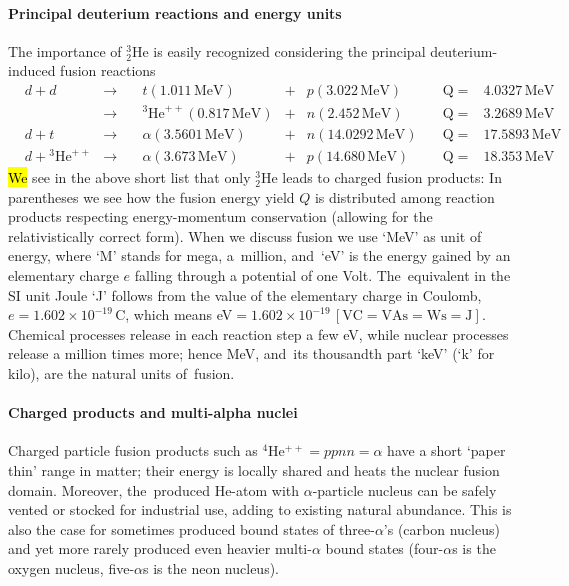 \documentclass[particles,article,accept,pdftex,moreauthors]{Definitions/mdpi}
\begin{document}
\vspace{-6pt}\paragraph*{\bf Principal deuterium reactions and energy units}
The importance of ${}^3_2$He is easily recognized considering the principal deuterium-induced fusion reactions
\begin{align}
&d+d&\to& \quad \label{eq:ddQp}
t (1.011\,\mathrm{MeV}) &+& p (3.022\,\mathrm{MeV})\quad &\mathrm{Q}=&4.0327\,\mathrm{MeV}\\
&&\to& \quad {}^3\mathrm{He}^{++} (0.817\,\mathrm{MeV})&+& n 	(2.452\,\mathrm{MeV})\quad &\mathrm{Q}=&3.2689\,\mathrm{MeV}\label{eq:ddQn}\\
&d+t&\to& \quad \label{eq:dtQ}
\alpha (3.5601\,\mathrm{MeV}) &+& n 	(14.0292\,\mathrm{MeV})\quad &\mathrm{Q}=&17.5893\,\mathrm{MeV}\\
&d+{}^3\mathrm{He}^{++} &\to & \quad \alpha (3.673\,\mathrm{MeV}) &+& p (14.680\,\mathrm{MeV}) \quad &\mathrm{Q}=&18.353\,\mathrm{MeV}\label{eq:dHeQ}
\end{align}
\hl{We} %
 see in the above short list that only ${}^3_2$He leads to charged fusion products: In parentheses we see how the fusion energy yield $Q$ is distributed among reaction products respecting energy-momentum conservation (allowing for the relativistically correct form). When we discuss fusion we use `MeV' as unit of energy, where `M' stands for mega, a~million, and~`eV' is the energy gained by an elementary charge $e$ falling through a potential of one Volt. The~equivalent in the SI unit Joule `J' follows from the value of the elementary charge in Coulomb, $e=1.602\times 10^{-19}\,\mathrm{C}$, which means eV$=1.602\times 10^{-19}\,\mathrm{[VC=VAs=Ws=J]}$. Chemical processes release in each reaction step a few eV, while nuclear processes release a million times more; hence MeV, and~its thousandth part `keV' (`k' for kilo), are the natural units of~fusion.

\vspace{-6pt}\paragraph*{\bf Charged products and multi-alpha nuclei}
Charged particle fusion products such as ${}^{4\!}$He${}^{++} =ppnn=\alpha$ have a short `paper thin' range in matter; their energy is locally shared and heats the nuclear fusion domain. Moreover, the~produced He-atom with $\alpha$-particle nucleus can be safely vented or stocked for industrial use, adding to existing natural abundance. This is also the case for sometimes produced bound states of three-$\alpha$'s (carbon nucleus) and yet more rarely produced even heavier multi-$\alpha$ bound states (four-$\alpha$s is the oxygen nucleus, five-$\alpha$s is the neon nucleus).
\end{document}
